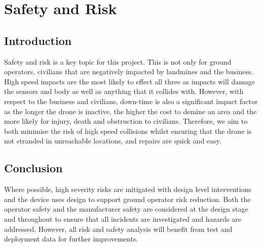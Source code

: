 \section{Safety and Risk}\label{Safety and Risk}
\subsection{Introduction}\label{sub_section:tgt_safety_intro}
Safety and risk is a key topic for this project. This is not only for ground operators, civilians that are negatively impacted by landmines and the business. High speed impacts are the most likely to effect all three as impacts will damage the sensors and body as well as anything that it collides with. However, with respect to the business and civilians, down-time is also a significant impact factor as the longer the drone is inactive, the higher the cost to demine an area and the more likely for injury, death and obstruction to civilians. Therefore, we aim to both minimise the risk of high speed collisions whilst ensuring that the drone is not stranded in unreachable locations, and repairs are quick and easy.


\subsection{Conclusion}
Where possible, high severity risks are mitigated with design level interventions and the device uses design to support ground operator risk reduction. Both the operator safety and the manufacturer safety are considered at the design stage and throughout to ensure that all incidents are investigated and hazards are addressed. However, all risk and safety analysis will benefit from test and deployment data for further improvements.